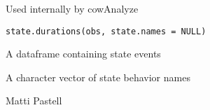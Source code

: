 \begin{Description}\relax
Used internally by cowAnalyze
\end{Description}
\begin{Usage}
\begin{verbatim}
state.durations(obs, state.names = NULL)
\end{verbatim}
\end{Usage}
\begin{Arguments}
\begin{ldescription}
\item[\code{obs}] A dataframe containing state events
\item[\code{state.names}] A character vector of state behavior names
\end{ldescription}
\end{Arguments}
\begin{Author}\relax
Matti Pastell
\end{Author}

